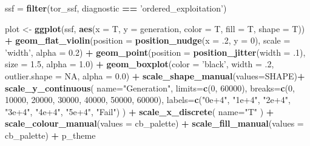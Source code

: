 \documentclass[]{book}
\newenvironment{Shaded}{\begin{snugshade}}{\end{snugshade}}
\newcommand{\DataTypeTok}[1]{\textcolor[rgb]{0.13,0.29,0.53}{#1}}
\newcommand{\DecValTok}[1]{\textcolor[rgb]{0.00,0.00,0.81}{#1}}
\newcommand{\FloatTok}[1]{\textcolor[rgb]{0.00,0.00,0.81}{#1}}
\newcommand{\KeywordTok}[1]{\textcolor[rgb]{0.13,0.29,0.53}{\textbf{#1}}}
\newcommand{\NormalTok}[1]{#1}
\newcommand{\OperatorTok}[1]{\textcolor[rgb]{0.81,0.36,0.00}{\textbf{#1}}}
\newcommand{\OtherTok}[1]{\textcolor[rgb]{0.56,0.35,0.01}{#1}}
\newcommand{\StringTok}[1]{\textcolor[rgb]{0.31,0.60,0.02}{#1}}
\begin{document}
\begin{Shaded}
\begin{Highlighting}[]
\NormalTok{ssf =}\StringTok{ }\KeywordTok{filter}\NormalTok{(tor_ssf, diagnostic }\OperatorTok{==}\StringTok{ 'ordered_exploitation'}\NormalTok{)}

\NormalTok{plot <-}\StringTok{ }\KeywordTok{ggplot}\NormalTok{(ssf, }\KeywordTok{aes}\NormalTok{(}\DataTypeTok{x =}\NormalTok{ T, }\DataTypeTok{y =}\NormalTok{ generation, }\DataTypeTok{color =}\NormalTok{ T, }\DataTypeTok{fill =}\NormalTok{ T, }\DataTypeTok{shape =}\NormalTok{ T)) }\OperatorTok{+}
\StringTok{  }\KeywordTok{geom_flat_violin}\NormalTok{(}\DataTypeTok{position =} \KeywordTok{position_nudge}\NormalTok{(}\DataTypeTok{x =} \FloatTok{.2}\NormalTok{, }\DataTypeTok{y =} \DecValTok{0}\NormalTok{), }\DataTypeTok{scale =} \StringTok{'width'}\NormalTok{, }\DataTypeTok{alpha =} \FloatTok{0.2}\NormalTok{) }\OperatorTok{+}
\StringTok{  }\KeywordTok{geom_point}\NormalTok{(}\DataTypeTok{position =} \KeywordTok{position_jitter}\NormalTok{(}\DataTypeTok{width =} \FloatTok{.1}\NormalTok{), }\DataTypeTok{size =} \FloatTok{1.5}\NormalTok{, }\DataTypeTok{alpha =} \FloatTok{1.0}\NormalTok{) }\OperatorTok{+}
\StringTok{  }\KeywordTok{geom_boxplot}\NormalTok{(}\DataTypeTok{color =} \StringTok{'black'}\NormalTok{, }\DataTypeTok{width =} \FloatTok{.2}\NormalTok{, }\DataTypeTok{outlier.shape =} \OtherTok{NA}\NormalTok{, }\DataTypeTok{alpha =} \FloatTok{0.0}\NormalTok{) }\OperatorTok{+}
\StringTok{  }\KeywordTok{scale_shape_manual}\NormalTok{(}\DataTypeTok{values=}\NormalTok{SHAPE)}\OperatorTok{+}
\StringTok{  }\KeywordTok{scale_y_continuous}\NormalTok{(}
    \DataTypeTok{name=}\StringTok{"Generation"}\NormalTok{,}
    \DataTypeTok{limits=}\KeywordTok{c}\NormalTok{(}\DecValTok{0}\NormalTok{, }\DecValTok{60000}\NormalTok{),}
    \DataTypeTok{breaks=}\KeywordTok{c}\NormalTok{(}\DecValTok{0}\NormalTok{, }\DecValTok{10000}\NormalTok{, }\DecValTok{20000}\NormalTok{, }\DecValTok{30000}\NormalTok{, }\DecValTok{40000}\NormalTok{, }\DecValTok{50000}\NormalTok{, }\DecValTok{60000}\NormalTok{),}
    \DataTypeTok{labels=}\KeywordTok{c}\NormalTok{(}\StringTok{"0e+4"}\NormalTok{, }\StringTok{"1e+4"}\NormalTok{, }\StringTok{"2e+4"}\NormalTok{, }\StringTok{"3e+4"}\NormalTok{, }\StringTok{"4e+4"}\NormalTok{, }\StringTok{"5e+4"}\NormalTok{, }\StringTok{"Fail"}\NormalTok{)}
\NormalTok{  ) }\OperatorTok{+}
\StringTok{  }\KeywordTok{scale_x_discrete}\NormalTok{(}
    \DataTypeTok{name=}\StringTok{"T"}
\NormalTok{  ) }\OperatorTok{+}
\StringTok{  }\KeywordTok{scale_colour_manual}\NormalTok{(}\DataTypeTok{values =}\NormalTok{ cb_palette) }\OperatorTok{+}
\StringTok{  }\KeywordTok{scale_fill_manual}\NormalTok{(}\DataTypeTok{values =}\NormalTok{ cb_palette) }\OperatorTok{+}
\StringTok{  }\NormalTok{p_theme}


\end{Highlighting}
\end{Shaded}
\end{document}
